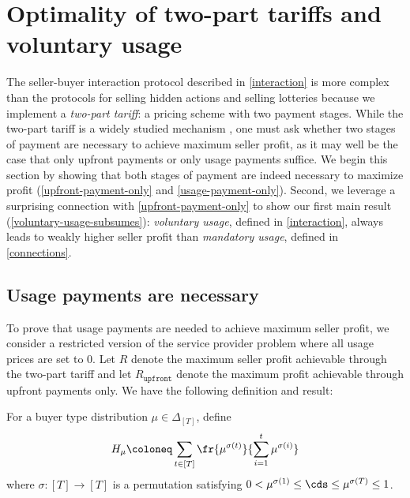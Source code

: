 \section{Optimality of two-part tariffs and voluntary usage} \label{two-payments}

The seller-buyer interaction protocol described in \cref{interaction} is more complex than the protocols for selling hidden actions \citep{bernasconi2024agent} and selling lotteries \citep{chen2015complexity} because we implement a \emph{two-part tariff}: a pricing scheme with two payment stages. While the two-part tariff is a widely studied mechanism \citep{hayes1987competition}, one must ask whether two stages of payment are necessary to achieve maximum seller profit, as
it may well be the case that only upfront payments or only usage payments suffice. We begin this section by showing that both stages of payment are indeed necessary to maximize profit (\cref{upfront-payment-only} and \cref{usage-payment-only}). Second, we leverage a surprising connection with \cref{upfront-payment-only} to show our first main result (\cref{voluntary-usage-subsumes}): \emph{voluntary usage}, defined in \cref{interaction}, always leads to weakly higher seller profit than \emph{mandatory usage}, defined in \cref{connections}.

\subsection{Usage payments are necessary} \label{usage-payment-necessary}

\newcommand{\Rupfront}{R_\mathtt{upfront}}

To prove that usage payments are needed to achieve maximum seller profit, we consider a restricted version of the service provider problem where all usage prices are set to 0. Let $R$ denote the maximum seller profit achievable through the two-part tariff and let $\Rupfront$ denote the maximum profit achievable through upfront payments only. We have the following definition and result:

\begin{definition*}
   For a buyer type distribution $\mu \in \Delta_{[T]}$, define  
    \begin{equation}\label{eq:H-mu}
    H_\mu \coloneq \sum_{t\in [T]} \fr{\mu^{\sigma(t)}}{\sum_{i=1}^t \mu^{\sigma(i)}}
    \end{equation}
    where $\sigma : [T] \to [T]$ is a permutation satisfying $0 < \mu^{\sigma(1)} \le \cds \leq \mu^{\sigma(T)} \leq 1$. 
\end{definition*}

